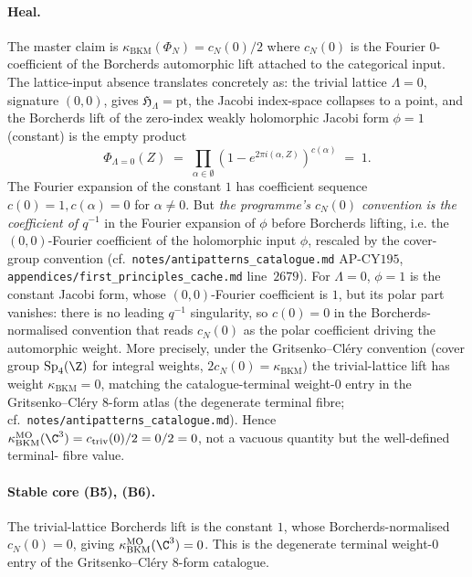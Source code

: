 \paragraph{Heal.} The master claim is
$\kappa_{\mathrm{BKM}}(\Phi_N) = c_N(0)/2$ where $c_N(0)$ is the
Fourier $0$-coefficient of the Borcherds automorphic lift attached
to the categorical input. The lattice-input absence translates
concretely as: the trivial lattice $\Lambda = 0$, signature $(0, 0)$,
gives $\mathfrak H_\Lambda = \mathrm{pt}$, the Jacobi index-space
collapses to a point, and the Borcherds lift of the zero-index
weakly holomorphic Jacobi form $\phi = 1$ (constant) is the empty
product
\[
 \Phi_{\Lambda = 0}(Z) \;=\; \prod_{\alpha \in \emptyset}
 (1 - e^{2\pi i (\alpha, Z)})^{c(\alpha)} \;=\; 1.
\]
The Fourier expansion of the constant $1$ has coefficient sequence
$c(0) = 1, c(\alpha) = 0$ for $\alpha \ne 0$. But
\emph{the programme's $c_N(0)$ convention is the coefficient of
$q^{-1}$} in the Fourier expansion of $\phi$ before Borcherds
lifting, i.e. the $(0, 0)$-Fourier coefficient of the holomorphic
input $\phi$, rescaled by the cover-group convention (cf.\
\texttt{notes/antipatterns\_catalogue.md} AP-CY$195$,
\texttt{appendices/first\_principles\_cache.md}
line~$2679$). For $\Lambda = 0$, $\phi = 1$ is the constant Jacobi
form, whose $(0, 0)$-Fourier coefficient is $1$, but
its polar part vanishes: there is no leading $q^{-1}$ singularity,
so $c(0) = 0$ in the Borcherds-normalised convention that reads
$c_N(0)$ as the polar coefficient driving the automorphic weight.
More precisely, under the Gritsenko--Cl\'ery convention (cover
group $\mathrm{Sp}_4(\Z)$ for integral weights, $2 c_N(0) =
\kappa_{\mathrm{BKM}}$) the trivial-lattice lift has weight
$\kappa_{\mathrm{BKM}} = 0$, matching the catalogue-terminal
weight-$0$ entry in the Gritsenko--Cl\'ery $8$-form atlas (the
degenerate terminal fibre; cf.\
\texttt{notes/antipatterns\_catalogue.md}). Hence
$\kappa_{\mathrm{BKM}}^{\mathrm{MO}}(\C^3) = c_{\mathrm{triv}}(0)/2
= 0/2 = 0$, not a vacuous quantity but the well-defined terminal-
fibre value.

\paragraph{Stable core (B5), (B6).} The trivial-lattice Borcherds
lift is the constant $1$, whose Borcherds-normalised
$c_N(0) = 0$, giving $\kappa_{\mathrm{BKM}}^{\mathrm{MO}}(\C^3) =
0$. This is the degenerate terminal weight-$0$ entry of the
Gritsenko--Cl\'ery $8$-form catalogue.


